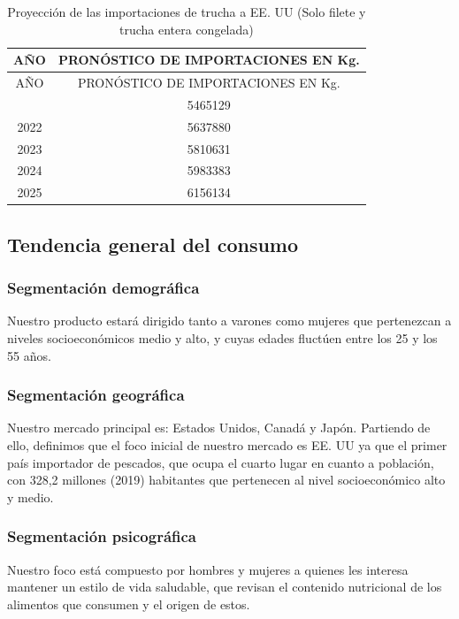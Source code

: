 \documentclass[
  stu,
  floatsintext,
  longtable,
  a4paper,
  nolmodern,
  notxfonts,
  notimes,
  colorlinks=true,linkcolor=blue,citecolor=blue,urlcolor=blue]{apa7}
\begin{document}
\begin{longtable}[]{@{}cc@{}}
\caption{Proyección de las importaciones de trucha a EE. UU (Solo filete
y trucha entera congelada)}\tabularnewline
\toprule\noalign{}
AÑO & PRONÓSTICO DE IMPORTACIONES EN Kg. \\
\midrule\noalign{}
\endfirsthead
\toprule\noalign{}
AÑO & PRONÓSTICO DE IMPORTACIONES EN Kg. \\
\midrule\noalign{}
\endhead
\bottomrule\noalign{}
\endlastfoot
2021 & 5465129 \\
2022 & 5637880 \\
2023 & 5810631 \\
2024 & 5983383 \\
2025 & 6156134 \\
\end{longtable}

\subsection{Tendencia general del
consumo}\label{tendencia-general-del-consumo}

\subsubsection{Segmentación
demográfica}\label{segmentaciuxf3n-demogruxe1fica}

Nuestro producto estará dirigido tanto a varones como mujeres que
pertenezcan a niveles socioeconómicos medio y alto, y cuyas edades
fluctúen entre los 25 y los 55 años.

\subsubsection{Segmentación
geográfica}\label{segmentaciuxf3n-geogruxe1fica}

Nuestro mercado principal es: Estados Unidos, Canadá y Japón. Partiendo
de ello, definimos que el foco inicial de nuestro mercado es EE. UU ya
que el primer país importador de pescados, que ocupa el cuarto lugar en
cuanto a población, con 328,2 millones (2019) habitantes que pertenecen
al nivel socioeconómico alto y medio.

\subsubsection{Segmentación
psicográfica}\label{segmentaciuxf3n-psicogruxe1fica}

Nuestro foco está compuesto por hombres y mujeres a quienes les interesa
mantener un estilo de vida saludable, que revisan el contenido
nutricional de los alimentos que consumen y el origen de estos.
\end{document}
